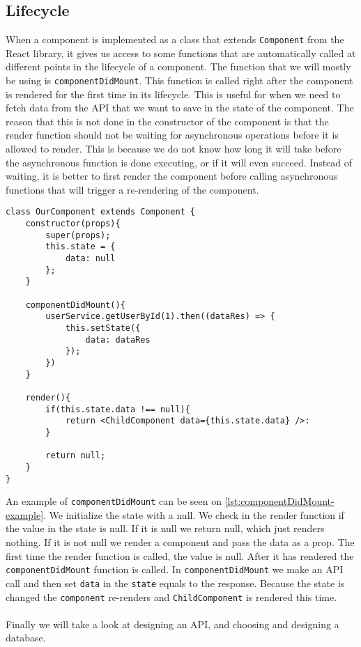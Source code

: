 \subsection*{Lifecycle}
When a component is implemented as a class that extends \texttt{Component} from the React library, it gives us access to some functions that are automatically called at different points in the lifecycle of a component.
The function that we will mostly be using is \texttt{componentDidMount}.
This function is called right after the component is rendered for the first time in its lifecycle.
This is useful for when we need to fetch data from the API that we want to save in the state of the component.
The reason that this is not done in the constructor of the component is that the render function should not be waiting for asynchronous operations before it is allowed to render.
This is because we do not know how long it will take before the asynchronous function is done executing, or if it will even succeed.
Instead of waiting, it is better to first render the component before calling asynchronous functions that will trigger a re-rendering of the component.
\begin{lstlisting}[caption={Example with the componentDidMount function}, label={lst:componentDidMount-example}]
class OurComponent extends Component {
	constructor(props){
		super(props);
		this.state = {
			data: null
		};
	}

	componentDidMount(){
		userService.getUserById(1).then((dataRes) => {
			this.setState({
				data: dataRes
			});
		})
	}

	render(){
		if(this.state.data !== null){
			return <ChildComponent data={this.state.data} />:
		}
			
		return null;
	}
}
\end{lstlisting}
An example of \texttt{componentDidMount} can be seen on \autoref{lst:componentDidMount-example}.
We initialize the state with a null.
We check in the render function if the value in the state is null.
If it is null we return null, which just renders nothing.
If it is not null we render a component and pass the data as a prop.
The first time the render function is called, the value is null.
After it has rendered the \texttt{componentDidMount} function is called.
In \texttt{componentDidMount} we make an API call and then set \texttt{data} in the \texttt{state} equals to the response.
Because the state is changed the \texttt{component} re-renders and \texttt{ChildComponent} is rendered this time.
\\\\
Finally we will take a look at designing an API, and choosing and designing a database.
